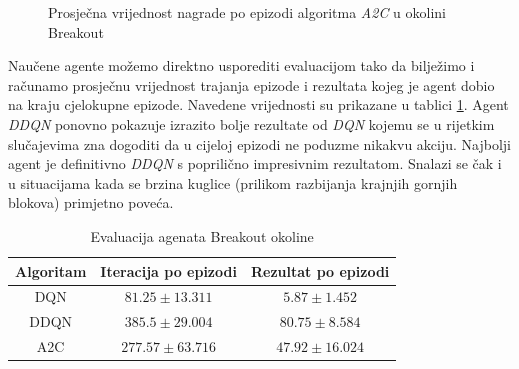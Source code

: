 \begin{figure}[H]
    \centering
    \caption{Prosječna vrijednost nagrade po epizodi algoritma \textit{A2C} u okolini Breakout}
    \label{fig:breakout-a2c-ep-rew-mean}
\end{figure}

Naučene agente možemo direktno usporediti evaluacijom tako da bilježimo i računamo prosječnu vrijednost trajanja epizode i rezultata kojeg je agent dobio na kraju cjelokupne epizode. Navedene vrijednosti su prikazane u tablici \ref{table:breakout-eval}. Agent \textit{DDQN} ponovno pokazuje izrazito bolje rezultate od \textit{DQN} kojemu se u rijetkim slučajevima zna dogoditi da u cijeloj epizodi ne poduzme nikakvu akciju. Najbolji agent je definitivno \textit{DDQN} s poprilično impresivnim rezultatom. Snalazi se čak i u situacijama kada se brzina kuglice (prilikom razbijanja krajnjih gornjih blokova) primjetno poveća.

\begin{table}[H]
    \centering
    \caption{Evaluacija agenata Breakout okoline}
    \begin{tabular}{c c c}
        \toprule
        Algoritam & Iteracija po epizodi & Rezultat po epizodi  \\
        \midrule
        DQN & $81.25 \pm 13.311$ & $5.87 \pm 1.452$ \\
        DDQN & $385.5 \pm 29.004$ & $80.75 \pm 8.584$ \\
        A2C & $277.57 \pm 63.716$ & $47.92 \pm 16.024$ \\
        \bottomrule
    \end{tabular}
    \label{table:breakout-eval}
\end{table}
